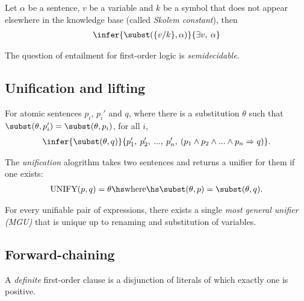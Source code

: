 \documentclass{article}
\begin{document}
\begin{theorem}
    Let $\alpha$ be a sentence, $v$ be a variable and $k$ be a
    symbol that does not appear elsewhere in the knowledge base
    (called \emph{Skolem constant}), then 
    \begin{align*}
        \infer{\subst(\{v/k\},\alpha)}{\exists v,\:\alpha}
    \end{align*} 
\end{theorem}

\begin{theorem}
    The question of entailment for first-order logic is \emph{semidecidable}.
\end{theorem} 

\subsection{Unification and lifting}

\begin{theorem}
    For atomic sentences $p_i$, $p_i'$ and $q$, where there is a substitution
    $\theta$ such that $\subst(\theta,p_i')=\subst(\theta,p_i)$, for
    all $i$,
    \begin{align*}
        \infer{\subst(\theta,q)}{p_1',\: p_2',\: ...,\: p_n',\:(p_1\wedge p_2 \wedge ... \wedge p_n\Rightarrow q)}.
    \end{align*}
\end{theorem}

\begin{definition}
    The \emph{unification} alogrithm takes two sentences and returns a unifier
    for them if one exists:
    \begin{align*}
        \text{UNIFY}(p,q)=\theta \hs\text{where}\hs \subst(\theta,p)=\subst(\theta,q).
    \end{align*}
\end{definition}

\begin{theorem}
    For every unifiable pair of expressions, there exists a single \emph{most general
    unifier (MGU)} that is unique up to renaming and substitution of variables.
\end{theorem}

\subsection{Forward-chaining}

\begin{definition}
    A \emph{definite} first-order clause is a disjunction of literals of which exactly
    one is positive.
\end{definition}
\end{document}
